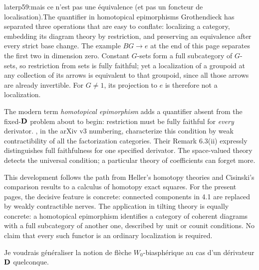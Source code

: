 \begin{dcomment}{later}{p59:mais ce n'est pas une équivalence (et pas un foncteur de localisation).}{The quantifier in homotopical epimorphisms}
Grothendieck has separated three operations that are easy to conflate: localizing a category, embedding its diagram theory by restriction, and preserving an equivalence after every strict base change. The example $BG\to e$ at the end of this page separates the first two in dimension zero. Constant $G$-sets form a full subcategory of $G$-sets, so restriction from sets is fully faithful; yet a localization of a groupoid at any collection of its arrows is equivalent to that groupoid, since all those arrows are already invertible. For $G\ne1$, its projection to $e$ is therefore not a localization.

The modern term \emph{homotopical epimorphism} adds a quantifier absent from the fixed-$\mathbf{D}$ problem about to begin: restriction must be fully faithful for \emph{every} derivator. \citet[Definition 6.1 and Theorem 6.10]{GrothStovicek2016Trees}, in the arXiv v3 numbering, characterize this condition by weak contractibility of all the factorization categories. Their Remark 6.3(ii) expressly distinguishes full faithfulness for one specified derivator. The space-valued theory detects the universal condition; a particular theory of coefficients can forget more.

This development follows the path from Heller's homotopy theories and Cisinski's comparison results to a calculus of homotopy exact squares. For the present pages, the decisive feature is concrete: connected components in 4.1 are replaced by weakly contractible nerves. The application in tilting theory is equally concrete: a homotopical epimorphism identifies a category of coherent diagrams with a full subcategory of another one, described by unit or counit conditions. No claim that every such functor is an ordinary localization is required.
\end{dcomment}


Je voudrais généraliser la notion de flèche $W_0$-biasphérique au cas d'un dérivateur $\mathbf{D}$ quelconque.

